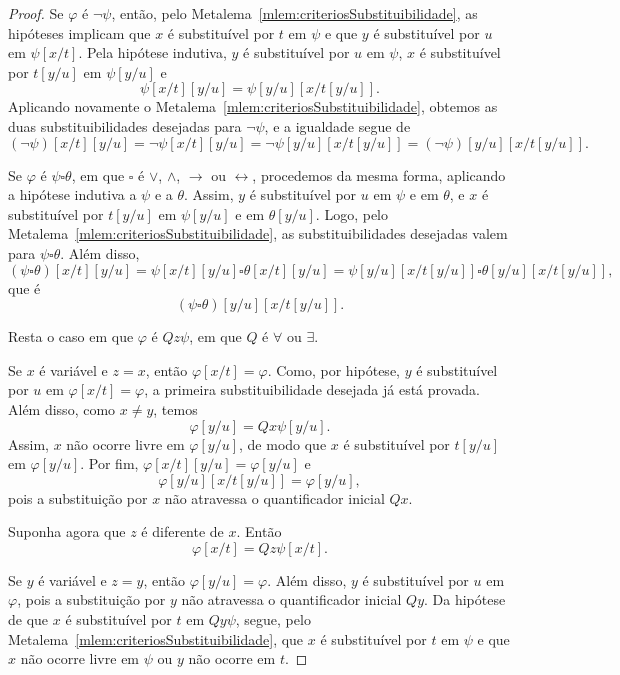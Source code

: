 \begin{proof}
    Se $\varphi$ é $\neg\psi$, então, pelo Metalema~\ref{mlem:criteriosSubstituibilidade}, as hipóteses implicam que $x$ é substituível por $t$ em $\psi$ e que $y$ é substituível por $u$ em $\psi[x/t]$.
    Pela hipótese indutiva, $y$ é substituível por $u$ em $\psi$, $x$ é substituível por $t[y/u]$ em $\psi[y/u]$ e
    \[
        \psi[x/t][y/u]=\psi[y/u][x/t[y/u]].
    \]
    Aplicando novamente o Metalema~\ref{mlem:criteriosSubstituibilidade}, obtemos as duas substituibilidades desejadas para $\neg\psi$, e a igualdade segue de
    \[
        (\neg\psi)[x/t][y/u]
        =
        \neg\psi[x/t][y/u]
        =
        \neg\psi[y/u][x/t[y/u]]
        =
        (\neg\psi)[y/u][x/t[y/u]].
    \]

    Se $\varphi$ é $\psi\square\theta$, em que $\square$ é $\vee$, $\wedge$, $\rightarrow$ ou $\leftrightarrow$, procedemos da mesma forma, aplicando a hipótese indutiva a $\psi$ e a $\theta$.
    Assim, $y$ é substituível por $u$ em $\psi$ e em $\theta$, e $x$ é substituível por $t[y/u]$ em $\psi[y/u]$ e em $\theta[y/u]$.
    Logo, pelo Metalema~\ref{mlem:criteriosSubstituibilidade}, as substituibilidades desejadas valem para $\psi\square\theta$.
    Além disso,
    \[
        (\psi\square\theta)[x/t][y/u]
        =
        \psi[x/t][y/u]\square\theta[x/t][y/u]
        =
        \psi[y/u][x/t[y/u]]\square\theta[y/u][x/t[y/u]],
    \]
    que é
    \[
        (\psi\square\theta)[y/u][x/t[y/u]].
    \]

    Resta o caso em que $\varphi$ é $Qz\psi$, em que $Q$ é $\forall$ ou $\exists$.

    Se $x$ é variável e $z=x$, então $\varphi[x/t]=\varphi$.
    Como, por hipótese, $y$ é substituível por $u$ em $\varphi[x/t]=\varphi$, a primeira substituibilidade desejada já está provada.
    Além disso, como $x\neq y$, temos
    \[
        \varphi[y/u]=Qx\psi[y/u].
    \]
    Assim, $x$ não ocorre livre em $\varphi[y/u]$, de modo que $x$ é substituível por $t[y/u]$ em $\varphi[y/u]$.
    Por fim, $\varphi[x/t][y/u]=\varphi[y/u]$ e
    \[
        \varphi[y/u][x/t[y/u]]=\varphi[y/u],
    \]
    pois a substituição por $x$ não atravessa o quantificador inicial $Qx$.

    Suponha agora que $z$ é diferente de $x$.
    Então
    \[
        \varphi[x/t]=Qz\psi[x/t].
    \]

    Se $y$ é variável e $z=y$, então $\varphi[y/u]=\varphi$.
    Além disso, $y$ é substituível por $u$ em $\varphi$, pois a substituição por $y$ não atravessa o quantificador inicial $Qy$.
    Da hipótese de que $x$ é substituível por $t$ em $Qy\psi$, segue, pelo Metalema~\ref{mlem:criteriosSubstituibilidade}, que $x$ é substituível por $t$ em $\psi$ e que $x$ não ocorre livre em $\psi$ ou $y$ não ocorre em $t$.


\end{proof}
